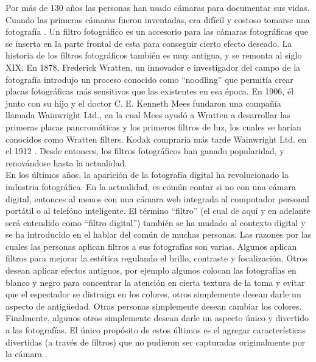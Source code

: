 \documentclass[a4paper,openright,12pt]{report}
\begin{document}
Por más de 130 años las personas han usado cámaras para documentar sus vidas.
Cuando las primeras cámaras fueron inventadas, era difícil y costoso tomarse una
fotografía \cite{snap2017prospectus}. Un filtro fotográfico es un accesorio para las
cámaras fotográficas que se inserta en la parte frontal de esta para conseguir
cierto efecto deseado. La historia de los filtros fotográficos también es muy
antigua, y se remonta al siglo XIX. En 1878, Frederick Wratten, un innovador e
investigador del campo de la fotografía introdujo un proceso conocido como
“noodling” que permitía crear placas fotográficas más sensitivos que las
existentes en esa época. En 1906, él junto con su hijo y el doctor C. E. Kenneth
Mees fundaron una compañía llamada Wainwright Ltd., en la cual Mees ayudó a
Wratten a desarrollar las primeras placas pancromáticas y los primeros filtros
de luz, los cuales se harían conocidos como Wratten filters. Kodak compraría
más tarde Wainwright Ltd. en el 1912 \cite{hannavy2013encyclopedia}⁠. Desde
entonces, los filtros fotográficos han ganado popularidad, y renovándose hasta
la actualidad.\\

En los últimos años, la aparición de la fotografía digital ha revolucionado la
industria fotográfica. En la actualidad, es común contar si no con una cámara
digital, entonces al menos con una cámara web integrada al computador personal
portátil o al telefóno inteligente. El término “filtro” (el cual de aquí y en
adelante será entendido como “filtro digital”) también se ha mudado al contexto
digital y se ha introducido en el hablar del común de muchas personas. Las
razones por las cuales las personas aplican filtros a sus fotografías son
varias. Algunos aplican filtros para mejorar la estética regulando el brillo,
contraste y focalización. Otros desean aplicar efectos antiguos, por ejemplo
algunos colocan las fotografías en blanco y negro para concentrar la atención
en cierta textura de la toma y evitar que el espectador se distraiga en los
colores, otros simplemente desean darle un aspecto de antigüedad. Otras personas
simplemente desean cambiar los colores. Finalmente, algunos otros simplemente
desean darle un aspecto único y divertido a las fotografías. El único propósito
de estos últimos es el agregar características divertidas (a través de filtros)
que no pudieron ser capturadas originalmente por la cámara
\cite{bakhshi2015we}.\\
\end{document}
